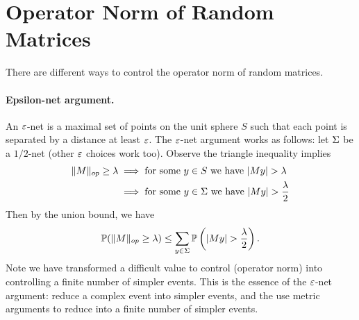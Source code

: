 \section*{Operator Norm of Random Matrices}

There are different ways to control the operator norm of random matrices.

\paragraph{Epsilon-net argument.} An $\e$-net is a maximal set of points on the unit sphere $S$ such that each point is separated by a distance at least $\e$. The $\e$-net argument works as follows: let $\S$ be a $1/2$-net (other $\e$ choices work too). Observe the triangle inequality implies
\[
    \begin{split}
        \|M\|_{op} \ge \l & \implies \text{for some $y \in S$ we have } |My| > \l            \\
                          & \implies \text{for some $y \in \S$ we have } |My| > \frac{\l}{2} \\
    \end{split}
\]
Then by the union bound, we have
\[
    \bP(\|M\|_{op} \ge \l) \le \sum_{y \in \S} \bP\left(|My| > \frac{\l}{2}\right).
\]
Note we have transformed a difficult value to control (operator norm) into controlling a finite number of simpler events. This is the essence of the $\e$-net argument: reduce a complex event into simpler events, and the use metric arguments to reduce into a finite number of simpler events.

